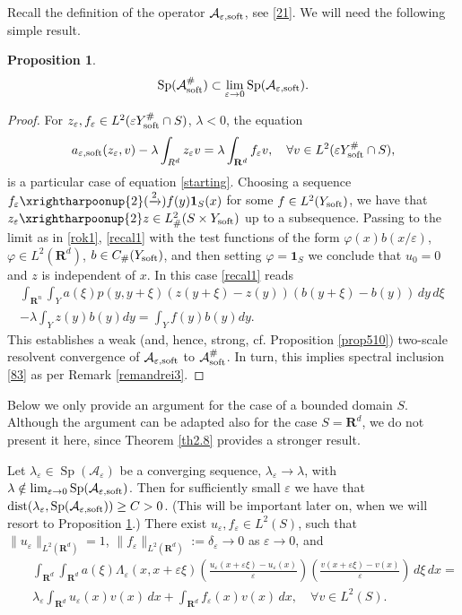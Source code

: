 \documentclass[11pt]{article}
\newcommand\e {\varepsilon}
\newcommand\soft{{\rm soft}}
\def\RR{\R}
\newcommand{\R}{\mathbf{R}}
\def\AA{\mathcal{A}}
\def\l{\lambda}
\newcommand\wtto{\xrightharpoonup{2}}
\newcommand\stto{\xrightarrow{2}}
\DeclareMathOperator{\Sp}{Sp}
\newcommand\dist{\operatorname{dist}}
\newtheorem{proposition}[theorem]{Proposition}
\theoremstyle{remark}
\begin{document}
Recall the definition of the operator $\AA_{\e,\rm soft}$, see \eqref{21}. We will need the following simple result.
\begin{proposition} \label{pr6.1}
	\begin{equation}\label{83}
		\Sp(\AA_\soft^\#) \subset     \lim_{\e\to 0}\Sp (\AA_{\e,\rm soft}).
	\end{equation}
\end{proposition}
\begin{proof}
	For $z_\e, f_\e  \in L^2(\e Y^\#_\soft \cap S)$, $\l<0$, the equation
	\begin{equation*}
		a_{\e,\soft}(z_\e, v) - \l \int_{R^d} z_\e v = \l \int_{\R^d} f_\e v, \quad \forall v\in L^2(\e Y^\#_\soft \cap S),
	\end{equation*}
	is a particular case of  equation \eqref{starting}. Choosing a sequence $f_\e \wtto (\stto) f(y) \mathbf 1_{S}(x)$ for some $f\in L^2(Y_\soft)$, we have that $z_\e\wtto z\in L^2_\#(S\times Y_\soft)$ up to a subsequence. Passing to the limit as in \eqref{rok1}, \eqref{recal1} with the   test functions of the form $\varphi(x)b(x/\e)$,  $\varphi \in L^2(\mathbf{R}^d)$, $b \in C_\#(Y_\soft)$, and then setting $\varphi  = \mathbf 1_{S} $ we conclude that $u_0 =0$ and $z$ is independent of $x$. In this case  \eqref{recal1} reads
	\begin{multline*}%
		\int_{\R^n}\int_{Y}  a(\xi)p(y, y+\xi)(z(y+\xi)-z(y))(b(y+\xi)-b(y)) \,dy\,d\xi\,
		\\
		-\lambda \int_{Y} z(y) b(y) dy= \int_{Y} f(y) b(y)dy.
	\end{multline*}
	This establishes a weak (and, hence, strong, cf. Proposition \ref{prop510}) two-scale resolvent convergence of $\AA_{\e,\soft}$ to  $\AA_{\soft}^\#$. In turn, this implies spectral inclusion \eqref{83} as per Remark \ref{remandrei3}.
\end{proof}
	
 Below we only provide an argument for the case of a bounded domain  $S$. Although the argument can be adapted also for the case $S= \R^d$, we do not present it here, since  Theorem \ref{th2.8} provides a stronger result.

Let $\lambda_\e \in \Sp (\AA_\e )$ be a converging sequence, $\l_\e\to \l$, with $\l \notin \lim_{\e\to 0} \Sp(\AA_{\e,\soft})$. Then for sufficiently small $\e$ we have that $\dist(\l_\e, \Sp(\AA_{\e,\soft})) \geq C>0$. (This will be important later on, when we will resort to Proposition \ref{pr6.1}.) There exist $u_\e , f_\e  \in L^2(S)$, such that $\|u_\e \|_{L^2(\RR^d)}=1$, $\|f_\e\|_{L^2(\RR^d)}:=\delta_\e\to 0$ as $\e\to 0$, and
	\begin{eqnarray} \nonumber
		& &\int_{\R^d} \int_{\R^d} a(\xi)\Lambda_\e (x, x+\e\xi)\left(\frac{u_\e (x+\e \xi)-u_\e (x)}\e  \right) \left(\frac{v(x+\e \xi)-v(x)}\e  \right)\,d\xi\,dx=\\ \label{estimate60} & & %
  \lambda_\e  \int_{\R^d} u_\e  (x)v(x) \,dx+\int_{\R^d} f_\e  (x) v(x) \,dx , \quad \forall v \in
  L^2(S).
	\end{eqnarray}
\end{document}
